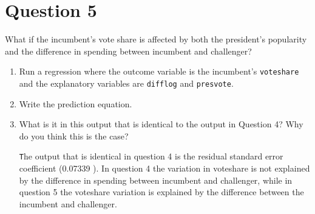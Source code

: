 \documentclass[12pt,letterpaper]{article}
\begin{document}
\newpage	

\section*{Question 5}%
\noindent What if the incumbent's vote share is affected by both the president's popularity and the difference in spending between incumbent and challenger? 
\begin{enumerate}
\item Run a regression where the outcome variable is the incumbent's \texttt{voteshare} and the explanatory variables are \texttt{difflog} and \texttt{presvote}.

		 
		
	\vspace{5cm}
\item Write the prediction equation.	\vspace{5cm}

		 
		
\item What is it in this output that is identical to the output in Question 4? Why do you think this is the case?%

	\texttt The output that is identical in  question 4 is the residual standard error coefficient (0.07339 ).  In question 4 the variation in voteshare is not explained by the difference in spending between incumbent and challenger, while in question 5 the voteshare variation is explained by the difference between the incumbent and challenger.  \\
	
	
\end{enumerate}
\end{document}
